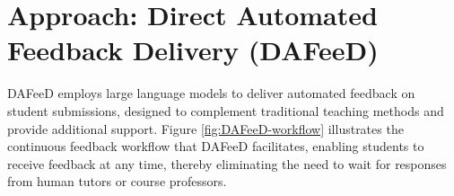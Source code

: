 \documentclass[manuscript,screen,review]{acmart}
\begin{document}
%


%


%


%



\newpage
\section{Approach: Direct Automated Feedback Delivery (DAFeeD)} %
\label{sec:approach:DAFeeD}

DAFeeD employs large language models to deliver automated feedback on student submissions, designed to complement traditional teaching methods and provide additional support.
Figure \ref{fig:DAFeeD-workflow} illustrates the continuous feedback workflow that DAFeeD facilitates, enabling students to receive feedback at any time, thereby eliminating the need to wait for responses from human tutors or course professors.
\end{document}
